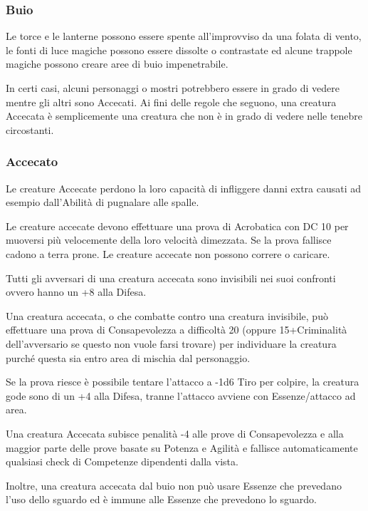 \documentclass[a4paper,11pt,twoside,openany]{book}
\begin{document}
\subsubsection{Buio}

\label{buio}

Le torce e le lanterne possono essere spente all'improvviso da una folata di vento, le fonti di luce magiche possono essere dissolte o contrastate ed alcune trappole magiche possono creare aree di buio impenetrabile.

In certi casi, alcuni personaggi o mostri potrebbero essere in grado di vedere mentre gli altri sono Accecati. Ai fini delle regole che seguono, una creatura Accecata è semplicemente una creatura che non è in grado di vedere nelle tenebre circostanti.

\subsubsection{Accecato}

\label{accecato}

Le creature Accecate perdono la loro capacità di infliggere danni extra causati ad esempio dall'Abilità di pugnalare alle spalle.

Le creature accecate devono effettuare una prova di Acrobatica con DC 10 per muoversi più velocemente della loro velocità dimezzata. Se la prova fallisce cadono a terra prone. Le creature accecate non possono correre o caricare.

Tutti gli avversari di una creatura accecata sono invisibili nei suoi confronti ovvero hanno un +8 alla Difesa.

Una creatura accecata, o che combatte contro una creatura invisibile, può effettuare una prova di Consapevolezza a difficoltà 20 (oppure 15+Criminalità dell'avversario se questo non vuole farsi trovare) per individuare la creatura purché questa sia entro area di mischia dal personaggio.

Se la prova riesce è possibile tentare l'attacco a -1d6 Tiro per colpire, la creatura gode sono di un +4 alla Difesa, tranne l'attacco avviene con Essenze/attacco ad area.

Una creatura Accecata subisce penalità -4 alle prove di Consapevolezza e alla maggior parte delle prove basate su Potenza e Agilità e fallisce automaticamente qualsiasi check di Competenze dipendenti dalla vista.

Inoltre, una creatura accecata dal buio non può usare Essenze che prevedano l'uso dello sguardo ed è immune alle Essenze che prevedono lo sguardo.
\end{document}
